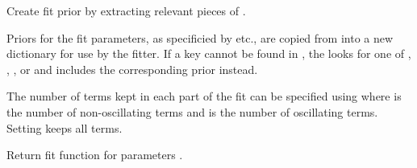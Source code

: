 \documentclass[letterpaper,10pt,english]{sphinxmanual}
\begin{document}
\begin{fulllineitems}
\begin{fulllineitems}
\label{corrfitter:corrfitter.Corr2.buildprior}
Create fit prior by extracting relevant pieces of .

Priors for the fit parameters, as specificied by  etc., 
are copied from  into a new dictionary for use by the
fitter. If a key  cannot be found in , the
 looks for one of , , 
, or  and includes the corresponding
prior instead.

The number of terms kept in each part of the fit can be 
specified using  where  is the 
number of non-oscillating terms and  is the number 
of oscillating terms. Setting  keeps 
all terms.

\end{fulllineitems}


\begin{fulllineitems}
\label{corrfitter:corrfitter.Corr2.fitfcn}
Return fit function for parameters .

\end{fulllineitems}


\end{fulllineitems}

\end{document}
